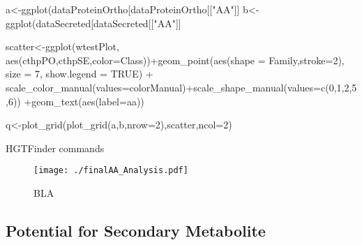 \documentclass[fontsize=10pt, paper=a4,fleqn, ]{wlscirep}
\begin{document}
\begin{listing}
{	a<-ggplot(dataProteinOrtho[dataProteinOrtho[["AA"]] %
	b<-ggplot(dataSecreted[dataSecreted[["AA"]] %
	
	scatter<-ggplot(wtestPlot, aes(cthpPO,cthpSE,color=Class))+geom_point(aes(shape = Family,stroke=2), size = 7, show.legend = TRUE) + scale_color_manual(values=colorManual)+scale_shape_manual(values=c(0,1,2,5,6)) +geom_text(aes(label=aa))
	
	q<-plot_grid(plot_grid(a,b,nrow=2),scatter,ncol=2)
  }
  \label{code:Amino Acid Composition Bias Analysis}
  \caption{HGTFinder commands}
\end{listing}
\fi


\begin{figure}[!h]
  \centering
  \texttt{[image: ./finalAA\_Analysis.pdf]}
  \caption{\label{fig:AABIAS} BLA  } 
\end{figure}



\subsection{Potential for Secondary Metabolite}
\end{document}
